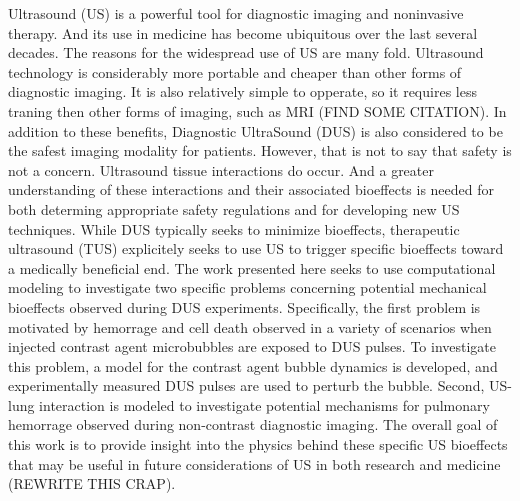 Ultrasound (US) is a powerful tool for diagnostic imaging and noninvasive therapy.
And its use in medicine has become ubiquitous over the last several decades.
The reasons for the widespread use of US are many fold.
Ultrasound technology is considerably more portable and cheaper than other forms of diagnostic imaging.
It is also relatively simple to opperate, so it requires less traning then other forms of imaging, such as MRI (FIND SOME CITATION).
In addition to these benefits, Diagnostic UltraSound (DUS) is also considered to be the safest imaging modality for patients.
However, that is not to say that safety is not a concern.
Ultrasound tissue interactions do occur.
And a greater understanding of these interactions and their associated bioeffects is needed for both determing appropriate safety regulations and for developing new US techniques.  
While DUS typically seeks to minimize bioeffects, therapeutic ultrasound (TUS) explicitely seeks to use US to trigger specific bioeffects toward a medically beneficial end.
The work presented here seeks to use computational modeling to investigate two specific problems concerning potential mechanical bioeffects observed during DUS experiments.
Specifically, the first problem is motivated by hemorrage and cell death observed in a variety of scenarios when injected contrast agent microbubbles are exposed to DUS pulses.
To investigate this problem, a model for the contrast agent bubble dynamics is developed, and experimentally measured DUS pulses are used to perturb the bubble.
Second, US-lung interaction is modeled to investigate potential mechanisms for pulmonary hemorrage observed during non-contrast diagnostic imaging.
The overall goal of this work is to provide insight into the physics behind these specific US bioeffects that may be useful in future considerations of US in both research and medicine (REWRITE THIS CRAP).

